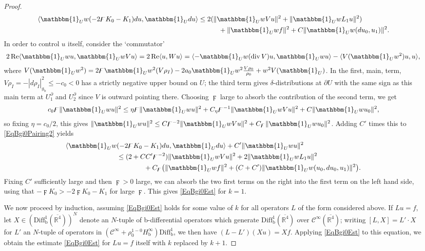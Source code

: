 \documentclass[reqno,11pt,letterpaper]{amsart}
\numberwithin{equation}{section}
\numberwithin{figure}{section}
\theoremstyle{definition}
\theoremstyle{remark}
\newcommand{\mc}{\mathcal}
\newcommand{\cC}{\mc C}
\newcommand{\R}{\mathbb{R}}
\newcommand{\one}{\mathbbm{1}}
\renewcommand{\Re}{\operatorname{Re}}
\newcommand{\dv}{\operatorname{div}}
\newcommand{\la}{\langle}
\newcommand{\ol}{\overline}
\newcommand{\pa}{\partial}
\newcommand{\ra}{\rangle}
\newcommand{\bop}{{\mathrm{b}}}
\newcommand{\Diff}{\mathrm{Diff}}
\newcommand{\Diffb}{\Diff_\bop}
\newcommand{\CI}{\cC^\infty}
\newcommand{\Hb}{H_{\bop}}
\begin{document}
\begin{proof}
  \begin{equation}
  \label{EqBgi0Pairing2}
  \begin{split}
    \la \one_U w (-2\digamma K_0-K_1)d u, \one_U d u\ra &\leq 2(\|\one_U w V u\|^2+\|\one_U w L_1 u\|^2) \\
      &\quad\qquad + \|\one_U w f\|^2 + C\| \one_U w(d u_0, u_1) \|^2.
  \end{split}
  \end{equation}
  In order to control $u$ itself, consider the `commutator'
  \begin{equation}
  \label{EqBgi0UItself}
    2\Re\la \one_U w u,\one_U w V u\ra = 2\Re\la u, W u\ra = \la -\one_U w(\dv V)u, \one_U w u\ra - \la V(\one_U w^2)u,u\ra,
  \end{equation}
  where $V(\one_U w^2)=2\digamma\one_U w^2(V\rho_I)-2 a_0\one_U w^2\tfrac{V\rho_0}{\rho_0}+w^2 V(\one_U)$. In the first, main, term, $V\rho_I=-|d\rho_I|_{g_\bop}^2\leq -c_0<0$ has a strictly negative upper bound on $U$; the third term gives $\delta$-distributions at $\pa U$ with the same sign as this main term at $U^\pa_1$ and $U^\pa_2$ since $V$ is outward pointing there. Choosing $\digamma$ large to absorb the contribution of the second term, we get
  \[
    c_0\digamma\|\one_U w u\|^2 \leq \eta\digamma\|\one_U w u\|^2 + C_\eta\digamma^{-1}\| \one_U w V u\|^2 + C\| \one_U w u_0 \|^2,
  \]
  so fixing $\eta=c_0/2$, this gives $\|\one_U w u\|^2 \leq C\digamma^{-2}\|\one_U w V u\|^2+C_\digamma\|\one_U w u_0\|^2$. Adding $C'$ times this to \eqref{EqBgi0Pairing2} yields
  \begin{align*}
    \la \one_U w&(-2\digamma K_0-K_1)d u,\one_U d u\ra + C' \|\one_U w u\|^2 \\
      &\leq (2+C C'\digamma^{-2})\|\one_U w V u\|^2 + 2\|\one_U w L_1 u\|^2 \\
      &\qquad\qquad + C_\digamma\bigl(\|\one_U w f\|^2+(C+C')\|\one_U w(u_0,d u_0,u_1)\|^2\bigr).
  \end{align*}
  Fixing $C'$ sufficiently large and then $\digamma>0$ large, we can absorb the two first terms on the right into the first term on the left hand side, using that $-\digamma K_0>-2\digamma K_0-K_1$ for large $\digamma$. This gives \eqref{EqBgi0Est} for $k=1$.

  We now proceed by induction, assuming \eqref{EqBgi0Est} holds for some value of $k$ for all operators $L$ of the form considered above. If $L u=f$, let $X\in(\Diffb^1(\ol{\R^4}))^N$ denote an $N$-tuple of b-differential operators which generate $\Diffb^1(\ol{\R^4})$ over $\CI(\ol{\R^4})$; writing $[L,X]=L'\cdot X$ for $L'$ an $N$-tuple of operators in $(\CI+\rho_0^{1-0}\Hb^\infty)\Diffb^1$, we then have $(L-L')(X u)=X f$. Applying \eqref{EqBgi0Est} to this equation, we obtain the estimate \eqref{EqBgi0Est} for $L u=f$ itself with $k$ replaced by $k+1$.
\end{proof}
\end{document}
